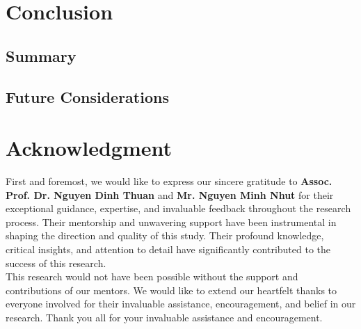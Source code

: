 \documentclass{ieeeojies}
\begin{document}
	\section{Conclusion}
	\subsection{Summary}
	
	\subsection{Future Considerations}
	\section*{Acknowledgment}
	First and foremost, we would like to express our sincere gratitude to \textbf{Assoc. Prof. Dr. Nguyen Dinh Thuan} and \textbf{Mr. Nguyen Minh Nhut} for their exceptional guidance, expertise, and invaluable feedback throughout the research process. Their mentorship and unwavering support have been instrumental in shaping the direction and quality of this study. Their profound knowledge, critical insights, and attention to detail have significantly contributed to the success of this research.
	\\This research would not have been possible without the support and contributions of our mentors. We would like to extend our heartfelt thanks to everyone involved for their invaluable assistance, encouragement, and belief in our research. Thank you all for your invaluable assistance and encouragement.
	
\end{document}
